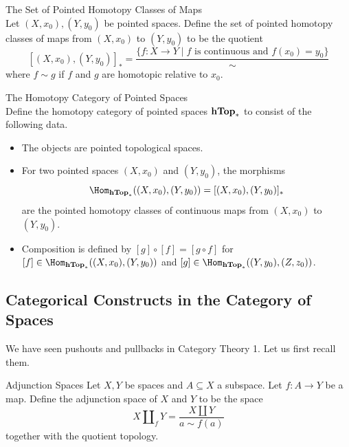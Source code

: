 \documentclass[a4paper]{article}
\begin{document}
\begin{defn}{The Set of Pointed Homotopy Classes of Maps}{}\\
Let $(X,x_0),(Y,y_0)$ be pointed spaces. Define the set of pointed homotopy classes of maps from $(X,x_0)$ to $(Y,y_0)$ to be the quotient $$[(X,x_0),(Y,y_0)]_\ast=\frac{\{f:X\to Y\;|\;f\text{ is continuous and }f(x_0)=y_0\}}{\sim}$$ where $f\sim g$ if $f$ and $g$ are homotopic relative to $x_0$. 
\end{defn}

\begin{defn}{The Homotopy Category of Pointed Spaces}{}\\
Define the homotopy category of pointed spaces $\bold{hTop}_\ast$ to consist of the following data. 
\begin{itemize}
\item The objects are pointed topological spaces. 
\item For two pointed spaces $(X,x_0)$ and $(Y,y_0)$, the morphisms $$\Hom_{\bold{hTop}_\ast}((X,x_0),(Y,y_0))=[(X,x_0),(Y,y_0)]_\ast$$ are the pointed homotopy classes of continuous maps from $(X,x_0)$ to $(Y,y_0)$. 
\item Composition is defined by $[g]\circ[f]=[g\circ f]$ for $[f]\in\Hom_{\bold{hTop}_\ast}((X,x_0),(Y,y_0))$ and $[g]\in\Hom_{\bold{hTop}_\ast}((Y,y_0),(Z,z_0))$. 
\end{itemize}
\end{defn}

\subsection{Categorical Constructs in the Category of Spaces}
We have seen pushouts and pullbacks in Category Theory 1. Let us first recall them. 

\begin{defn}{Adjunction Spaces}{} Let $X,Y$ be spaces and $A\subseteq X$ a subspace. Let $f:A\to Y$ be a map. Define the adjunction space of $X$ and $Y$ to be  the space $$X\amalg_fY=\frac{X\amalg Y}{a\sim f(a)}$$ together with the quotient topology. 
\end{defn}
\end{document}
